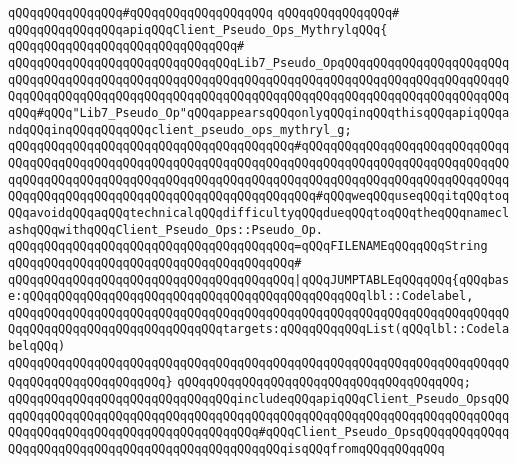 \verb|qQQqqQQqqQQqqQQq#qQQqqQQqqQQqqQQqqQQq|\newline
\verb|qQQqqQQqqQQqqQQq#|\newline
\verb|qQQqqQQqqQQqqQQqapiqQQqClient_Pseudo_Ops_MythrylqQQq{|\newline
\verb|qQQqqQQqqQQqqQQqqQQqqQQqqQQqqQQq#|\newline
\verb|qQQqqQQqqQQqqQQqqQQqqQQqqQQqqQQqLib7_Pseudo_OpqQQqqQQqqQQqqQQqqQQqqQQqqQQqqQQqqQQqqQQqqQQqqQQqqQQqqQQqqQQqqQQqqQQqqQQqqQQqqQQqqQQqqQQqqQQqqQQqqQQqqQQqqQQqqQQqqQQqqQQqqQQqqQQqqQQqqQQqqQQqqQQqqQQqqQQqqQQqqQQqqQQqqQQq#qQQq"Lib7_Pseudo_Op"qQQqappearsqQQqonlyqQQqinqQQqthisqQQqapiqQQqandqQQqinqQQqqQQqqQQqclient_pseudo_ops_mythryl_g;|\newline
\verb|qQQqqQQqqQQqqQQqqQQqqQQqqQQqqQQqqQQqqQQq#qQQqqQQqqQQqqQQqqQQqqQQqqQQqqQQqqQQqqQQqqQQqqQQqqQQqqQQqqQQqqQQqqQQqqQQqqQQqqQQqqQQqqQQqqQQqqQQqqQQqqQQqqQQqqQQqqQQqqQQqqQQqqQQqqQQqqQQqqQQqqQQqqQQqqQQqqQQqqQQqqQQqqQQqqQQqqQQqqQQqqQQqqQQqqQQqqQQqqQQqqQQqqQQqqQQq#qQQqweqQQquseqQQqitqQQqtoqQQqavoidqQQqaqQQqtechnicalqQQqdifficultyqQQqdueqQQqtoqQQqtheqQQqnameclashqQQqwithqQQqClient_Pseudo_Ops::Pseudo_Op.|\newline
\verb|qQQqqQQqqQQqqQQqqQQqqQQqqQQqqQQqqQQqqQQq=qQQqFILENAMEqQQqqQQqString|\newline
\verb|qQQqqQQqqQQqqQQqqQQqqQQqqQQqqQQqqQQqqQQq#|\newline
\verb|qQQqqQQqqQQqqQQqqQQqqQQqqQQqqQQqqQQqqQQq|\verb#|qQQqJUMPTABLEqQQqqQQq{qQQqbase:qQQqqQQqqQQqqQQqqQQqqQQqqQQqqQQqqQQqqQQqqQQqqQQqlbl::Codelabel,#\newline
\verb|qQQqqQQqqQQqqQQqqQQqqQQqqQQqqQQqqQQqqQQqqQQqqQQqqQQqqQQqqQQqqQQqqQQqqQQqqQQqqQQqqQQqqQQqqQQqqQQqqQQqtargets:qQQqqQQqqQQqList(qQQqlbl::CodelabelqQQq)|\newline
\verb|qQQqqQQqqQQqqQQqqQQqqQQqqQQqqQQqqQQqqQQqqQQqqQQqqQQqqQQqqQQqqQQqqQQqqQQqqQQqqQQqqQQqqQQqqQQq}|\newline
\verb|qQQqqQQqqQQqqQQqqQQqqQQqqQQqqQQqqQQqqQQq;|\newline
\newline
\verb|qQQqqQQqqQQqqQQqqQQqqQQqqQQqqQQqincludeqQQqapiqQQqClient_Pseudo_OpsqQQqqQQqqQQqqQQqqQQqqQQqqQQqqQQqqQQqqQQqqQQqqQQqqQQqqQQqqQQqqQQqqQQqqQQqqQQqqQQqqQQqqQQqqQQqqQQqqQQqqQQqqQQq#qQQqClient_Pseudo_OpsqQQqqQQqqQQqqQQqqQQqqQQqqQQqqQQqqQQqqQQqqQQqqQQqqQQqisqQQqfromqQQqqQQqqQQq|\newline
